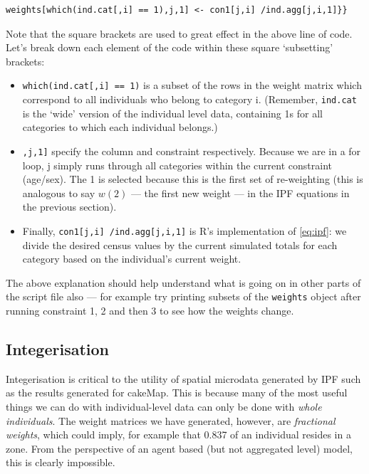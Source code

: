 \documentclass[a4paper, 11pt, twoside]{article}
\begin{document}
\begin{lstlisting}[float=h, caption={Saving the new weights after the first
constraint of IPF --- see line 43 in cMap.R}]
weights[which(ind.cat[,i] == 1),j,1] <- con1[j,i] /ind.agg[j,i,1]}}
\end{lstlisting}

Note that the square brackets are used to great effect in the above line of code.
Let's break down each element of the code within these square `subsetting' brackets:
\begin{itemize}
 \item \texttt{which(ind.cat[,i] == 1)} is a subset of the rows in the weight matrix
 which correspond to all individuals who belong to category i. (Remember,
 \texttt{ind.cat} is the `wide' version of the individual level data, containing
 1s for all categories to which each individual belongs.)
 \item \texttt{,j,1]} specify the column and constraint respectively.
 Because we are in a for loop, j simply runs through all categories within the
 current constraint (age/sex). The 1 is selected because this is the first set of
 re-weighting (this is analogous to say $w(2)$ --- the first new weight ---
 in the IPF equations in the previous section).
 \item Finally, \texttt{con1[j,i] /ind.agg[j,i,1]} is R's implementation of
 \cref{eq:ipf}: we divide the desired census values by the current simulated
 totals for each category based on the individual's current weight.
\end{itemize}

The above explanation should help understand what is going on in other
parts of the script file also --- for example try printing subsets of
the \texttt{weights} object after running constraint 1, 2 and then 3 to
see how the weights change.


\subsection{Integerisation}
Integerisation is critical to the utility of spatial microdata generated
by IPF such as the results generated for cakeMap. This is because
many of the most useful things we can do with individual-level data can only
be done with \emph{whole individuals}. The weight matrices we have generated, however,
are \emph{fractional weights}, which could imply, for example that 0.837 of an
individual resides in a zone. From the perspective of an agent based (but not
aggregated level) model, this is clearly impossible.
\end{document}

